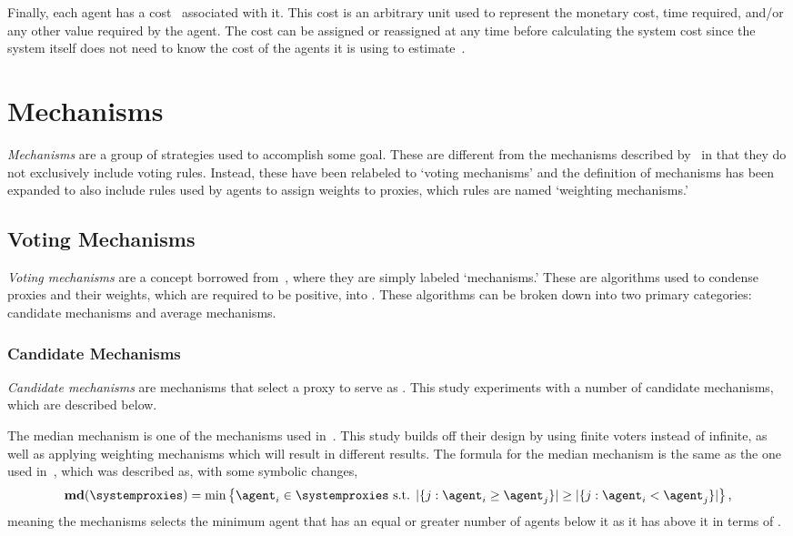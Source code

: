 Finally, each agent has a cost \agentcost\ associated with it.
This cost is an arbitrary unit used to represent the monetary cost, time
required, and/or any other value required by the agent.
The cost can be assigned or reassigned at any time before calculating the
system cost since the system itself does not need to know the cost of the
agents it is using to estimate~\truth.



\section{Mechanisms}\label{sec:mechanisms}
\textit{Mechanisms} are a group of strategies used to accomplish some goal.
These are different from the mechanisms described by~\cite{Cohensius2017} in
that they do not exclusively include voting rules.
Instead, these have been relabeled to `voting mechanisms' and the definition
of mechanisms has been expanded to also include rules used by agents to
assign weights to proxies, which rules are named `weighting mechanisms.'

\subsection{Voting Mechanisms}\label{subsec:voting-mechanisms}
\textit{Voting mechanisms} are a concept borrowed from~\cite{Cohensius2017},
where they are simply labeled `mechanisms.'
These are algorithms used to condense proxies and their weights, which are
required to be positive, into \systemtruth.
These algorithms can be broken down into two primary categories: candidate
mechanisms and average mechanisms.

\subsubsection{Candidate Mechanisms}\label{subsubsec:candidate-mechanisms}
\textit{Candidate mechanisms} are mechanisms that select a proxy to serve as
\systemtruth.
This study experiments with a number of candidate mechanisms, which are
described below.

The median mechanism is one of the mechanisms used in~\cite{Cohensius2017}.
This study builds off their design by using finite voters instead of
infinite, as well as applying weighting mechanisms which will result in
different results.
The formula for the median mechanism is the same as the one used
in~\cite[para.~2.4]{Cohensius2017}, which was described as, with some
symbolic changes,
\begin{equation*}
    \textbf{md}(\systemproxies) =
    \min\left\{\agent_i \in \systemproxies \text{ s.t. }
    |\{j: \agent_i \geq \agent_j\}| \geq
    |\{j: \agent_i < \agent_j\}|
    \right\}
    \text{,}
\end{equation*}
meaning the mechanisms selects the minimum agent that has an equal or greater
number of agents below it as it has above it in terms of \agenttruth.

